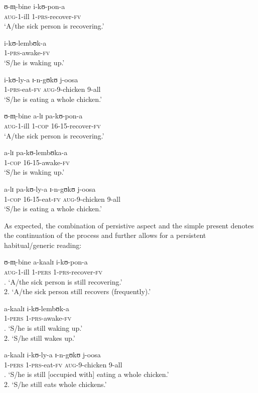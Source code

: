 \begin{exe}
\ex \label{exSimpleAccomplishmentPRS}
\begin{xlist}
\ex \gll ʊ-m̩-bine i-kʊ-pon-a\\
\textsc{aug}-1-ill 1-\textsc{prs}-recover-\textsc{fv}\\
\glt \lq A/the sick person is recovering.'

\ex \gll i-kʊ-lembʊk-a\\
1-\textsc{prs}-awake-\textsc{fv}\\
\glt \lq S/he is waking up.'

\ex \gll i-kʊ-ly-a ɪ-n-gʊkʊ j-oosa\\
1-\textsc{prs}-eat-\textsc{fv} \textsc{aug}-9-chicken 9-all\\
\glt \lq S/he is eating a whole chicken.'
\end{xlist}
\ex \label{exSimpleAccomplishmentPROG}
\begin{xlist}
\ex \gll ʊ-m̩-bine a-lɪ pa-kʊ-pon-a\\
\textsc{aug}-1-ill 1-\textsc{cop} 16-15-recover-\textsc{fv}\\
\glt \lq A/the sick person is recovering.'

\ex \gll a-lɪ pa-kʊ-lembʊka-a\\
1-\textsc{cop} 16-15-awake-\textsc{fv}\\
\glt \lq S/he is waking up.'

\ex \gll a-lɪ pa-kʊ-ly-a ɪ-n-gʊkʊ j-oosa\\
1-\textsc{cop} 16-15-eat-\textsc{fv} \textsc{aug}-9-chicken 9-all\\
\glt \lq S/he is eating a whole chicken.'
\end{xlist}
\end{exe}

As expected, the combination of persistive aspect and the simple present denotes the continuation of the process and further allows for a persistent habitual/generic reading:

\begin{exe}
\ex
\begin{xlist}
\ex \gll ʊ-m̩-bine a-kaalɪ i-kʊ-pon-a\\
\textsc{aug}-1-ill 1-\textsc{pers} 1-\textsc{prs}-recover-\textsc{fv}\\
. \lq  A/the sick person is still recovering.'\\ 2. \lq  A/the sick person still recovers (frequently).'

\ex \gll a-kaalɪ i-kʊ-lembʊk-a\\
1-\textsc{pers} 1-\textsc{prs}-awake-\textsc{fv}\\
. \lq S/he is still waking up.'\\ 2. \lq S/he still wakes up.'

\ex \gll a-kaalɪ i-kʊ-ly-a ɪ-n-gʊkʊ j-oosa\\
1-\textsc{pers} 1-\textsc{prs}-eat-\textsc{fv} \textsc{aug}-9-chicken 9-all\\
. \lq S/he is still [occupied with] eating a whole chicken.'\\
2. \lq S/he still eats whole chickens.'
\end{xlist}
\end{exe}


